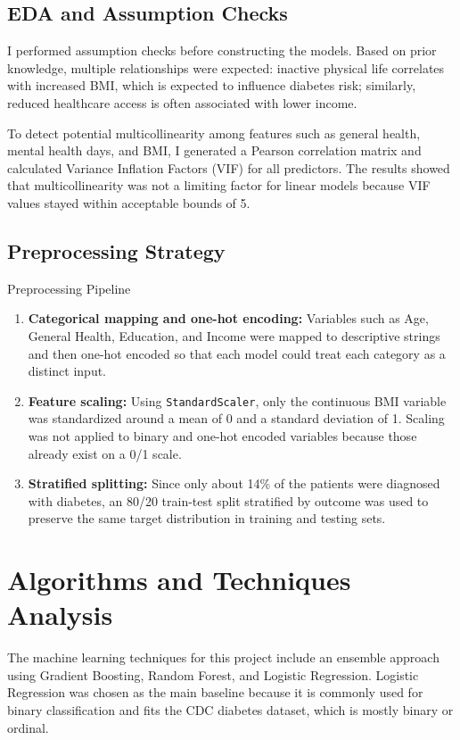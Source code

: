 \documentclass[11pt,letterpaper]{article}
\begin{document}
\subsection{EDA and Assumption Checks}
I performed assumption checks before constructing the models. Based on prior knowledge, multiple relationships were expected: inactive physical life correlates with increased BMI, which is expected to influence diabetes risk; similarly, reduced healthcare access is often associated with lower income.

To detect potential multicollinearity among features such as general health, mental health days, and BMI, I generated a Pearson correlation matrix and calculated Variance Inflation Factors (VIF) for all predictors. The results showed that multicollinearity was not a limiting factor for linear models because VIF values stayed within acceptable bounds of 5.

\subsection{Preprocessing Strategy}
\begin{methodbox}{Preprocessing Pipeline}
\begin{enumerate}[leftmargin=*, itemsep=0.35em]
  \item \textbf{Categorical mapping and one-hot encoding:} Variables such as Age, General Health, Education, and Income were mapped to descriptive strings and then one-hot encoded so that each model could treat each category as a distinct input.
  \item \textbf{Feature scaling:} Using \texttt{StandardScaler}, only the continuous BMI variable was standardized around a mean of 0 and a standard deviation of 1. Scaling was not applied to binary and one-hot encoded variables because those already exist on a 0/1 scale.
  \item \textbf{Stratified splitting:} Since only about 14\% of the patients were diagnosed with diabetes, an 80/20 train-test split stratified by outcome was used to preserve the same target distribution in training and testing sets.
\end{enumerate}
\end{methodbox}

\section{Algorithms and Techniques Analysis}
The machine learning techniques for this project include an ensemble approach using Gradient Boosting, Random Forest, and Logistic Regression. Logistic Regression was chosen as the main baseline because it is commonly used for binary classification and fits the CDC diabetes dataset, which is mostly binary or ordinal.
\end{document}
